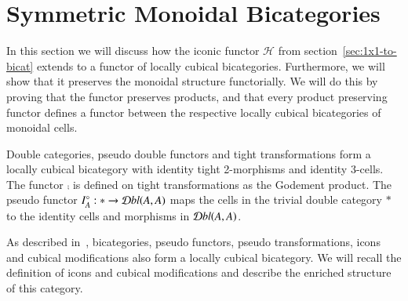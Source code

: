 \section{Symmetric Monoidal Bicategories}
\label{sec:constr-symm-mono}

In this section we will discuss how the iconic functor $\mathcal{H}$ from section~\ref{sec:1x1-to-bicat} extends to a functor of locally cubical bicategories. Furthermore, we will show that it preserves the monoidal structure functorially. We will do this by proving that the functor preserves products, and that every product preserving functor defines a functor between the respective locally cubical bicategories of monoidal cells. 

Double categories, pseudo double functors and tight transformations form a locally cubical bicategory with identity tight 2-morphisms and identity 3-cells. The functor $\comp$ is defined on tight transformations as the Godement product. The pseudo functor $I^{\circ}_A: * \rightarrow \mathcal{D} bl(A,A)$ maps the cells in the trivial double category $*$ to the identity cells and morphisms in $\mathcal{D} bl(A,A)$. 

As described in~\cite{gg:ldstr-tricat}, bicategories, pseudo functors, pseudo transformations, icons and cubical modifications also form a locally cubical bicategory. We will recall the definition of icons and cubical modifications and describe the enriched structure of this category.

